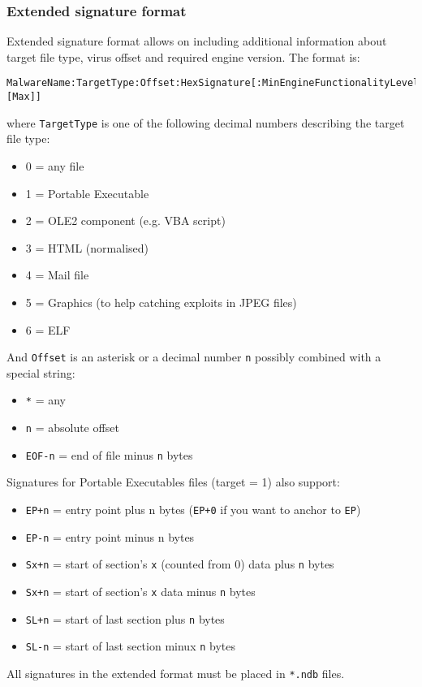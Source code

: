 \documentclass[a4paper,titlepage,12pt]{article}
\begin{document}
    \subsubsection{Extended signature format}
    Extended signature format allows on including additional information about
    target file type, virus offset and required engine version.
    The format is:
    \begin{verbatim}
MalwareName:TargetType:Offset:HexSignature[:MinEngineFunctionalityLevel:[Max]]
    \end{verbatim}
    where \verb+TargetType+ is one of the following decimal numbers describing
    the target file type:
    \begin{itemize}
	\item 0 = any file
	\item 1 = Portable Executable
	\item 2 = OLE2 component (e.g. VBA script)
	\item 3 = HTML (normalised)
	\item 4 = Mail file
	\item 5 = Graphics (to help catching exploits in JPEG files)
	\item 6 = ELF
    \end{itemize}
    And	\verb+Offset+ is an asterisk or a decimal number \verb+n+ possibly
    combined with a special string:
    \begin{itemize}
	\item \verb+*+ = any
	\item \verb+n+ = absolute offset
	\item \verb+EOF-n+ = end of file minus \verb+n+ bytes
    \end{itemize}
    Signatures for Portable Executables files (target = 1) also support:
    \begin{itemize}
	\item \verb#EP+n# = entry point plus n bytes (\verb#EP+0# if you
	want to anchor to \verb+EP+)
	\item \verb#EP-n# = entry point minus n bytes
	\item \verb#Sx+n# = start of section's \verb+x+ (counted from 0)
	data plus \verb+n+ bytes
	\item \verb#Sx+n# = start of section's \verb+x+ data minus \verb+n+ bytes
	\item \verb#SL+n# = start of last section plus \verb+n+ bytes
	\item \verb#SL-n# = start of last section minux \verb+n+ bytes
    \end{itemize}
    All signatures in the extended format must be placed in \verb+*.ndb+ files.
\end{document}
